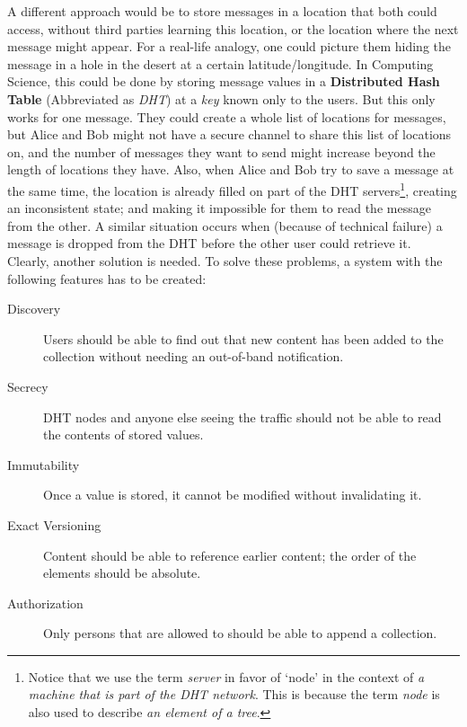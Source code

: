 \documentclass[a4paper]{article}
\begin{document}
A different approach would be to store messages in a location that both could access, without third parties learning this location, or the location where the next message might appear. For a real-life analogy, one could picture them hiding the message in a hole in the desert at a certain latitude/longitude. In Computing Science, this could be done by storing message values in a \textbf{Distributed Hash Table} (Abbreviated as \textit{DHT}) at a \textit{key} known only to the users. But this only works for one message. They could create a whole list of locations for messages, but Alice and Bob might not have a secure channel to share this list of locations on, and the number of messages they want to send might increase beyond the length of locations they have. Also, when Alice and Bob try to save a message at the same time, the location is already filled on part of the DHT servers\footnote{Notice that we use the term \textit{server} in favor of `node' in the context of \textit{a machine that is part of the DHT network}. This is because the term \textit{node} is also used to describe \textit{an element of a tree}.}, creating an inconsistent state; and making it impossible for them to read the message from the other. A similar situation occurs when (because of technical failure) a message is dropped from the DHT before the other user could retrieve it.\\

Clearly, another solution is needed. To solve these problems, a system with the following features has to be created:

\begin{description}
	\item[Discovery] Users should be able to find out that new content has been added to the collection without needing an out-of-band notification.
	\item[Secrecy] DHT nodes and anyone else seeing the traffic should not be able to read the contents of stored values.
	\item[Immutability] Once a value is stored, it cannot be modified without invalidating it.
	\item[Exact Versioning] Content should be able to reference earlier content; the order of the elements should be absolute.
	\item[Authorization] Only persons that are allowed to should be able to append a collection.

\end{description}
\end{document}
